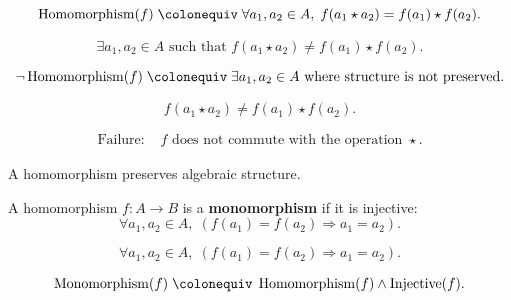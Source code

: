 \begin{remark*}
\[
\operatorname{Homomorphism}(f)
\;\colonequiv\;
\forall a_1,a_2 \in A,\;
f(a_1 \star a_2)=f(a_1)\star f(a_2).
\]
\end{remark*}

\begin{remark*}
\[
\exists a_1,a_2 \in A \text{ such that }
f(a_1 \star a_2) \ne f(a_1)\star f(a_2).
\]
\end{remark*}

\begin{remark*}
\[
\neg \operatorname{Homomorphism}(f)
\;\colonequiv\;
\exists a_1,a_2 \in A \text{ where structure is not preserved}.
\]
\end{remark*}

\begin{remark*}
\[
f(a_1 \star a_2) \ne f(a_1)\star f(a_2).
\]
\end{remark*}

\begin{remark*}
\[
\begin{aligned}
\text{Failure: } 
&f \text{ does not commute with the operation } \star.
\end{aligned}
\]
\end{remark*}

\begin{remark*}[Interpretation]
A homomorphism preserves algebraic structure.
\end{remark*}


\begin{tcolorbox}[title={Definition --- Monomorphism}]
\begin{definition}[Monomorphism]
\label{def:monomorphism}
A homomorphism $f : A \to B$ is a \textbf{monomorphism} if it is injective:
\[
\forall a_1,a_2 \in A,\;
(f(a_1)=f(a_2)\Rightarrow a_1=a_2).
\]
\end{definition}
\end{tcolorbox}

\begin{remark*}
\[
\forall a_1,a_2 \in A,\;
(f(a_1)=f(a_2)\Rightarrow a_1=a_2).
\]
\end{remark*}

\begin{remark*}
\[
\operatorname{Monomorphism}(f)
\;\colonequiv\;
\operatorname{Homomorphism}(f)
\land
\operatorname{Injective}(f).
\]
\end{remark*}

